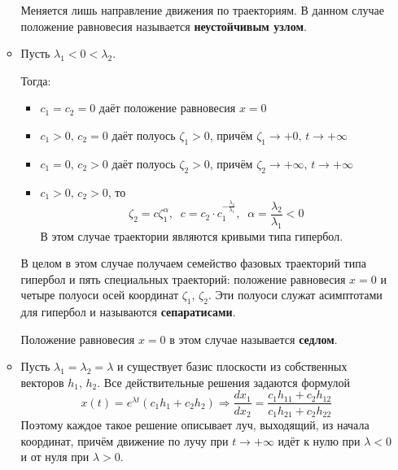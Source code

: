 \documentclass[a4paper,12pt]{article}
\theoremstyle{plain}
\theoremstyle{definition}
\theoremstyle{remark}
\begin{document}
\begin{enumerate}
\begin{itemize}
		            Меняется лишь направление движения по траекториям. В данном случае положение равновесия называется \textbf{неустойчивым узлом}.
		      \item Пусть $\lambda_1 < 0 < \lambda_2$.

		            Тогда:
		            \begin{itemize}
			            \item $c_1 = c_2 = 0$ даёт положение равновесия $x = 0$
			            \item $c_1 > 0,\, c_2 = 0$ даёт полуось $\zeta_1 > 0$, причём $\zeta_1 \to +0,\, t \to +\infty$
			            \item $c_1 = 0,\, c_2 > 0$ даёт полуось $\zeta_2 > 0$, причём $\zeta_2 \to +\infty,\, t \to +\infty$
			            \item $c_1 > 0,\, c_2 > 0$, то
			                  \[\zeta_2 = c\zeta_1^\alpha,\;\; c = c_2 \cdot c_1^{-\frac{\lambda_2}{\lambda_1}},\;\; \alpha = \frac{\lambda_2}{\lambda_1} < 0\]
			                  В этом случае траектории являются кривыми типа гипербол.
		            \end{itemize}
		            В целом в этом случае получаем семейство фазовых траекторий типа гипербол и пять специальных траекторий: положение равновесия $x = 0$ и четыре полуоси осей координат $\zeta_1,\, \zeta_2$. Эти полуоси служат асимптотами для гипербол и называются \textbf{сепаратисами}.

		            Положение равновесия $x = 0$ в этом случае называется \textbf{седлом}.
		      \item Пусть $\lambda_1 = \lambda_2 = \lambda$ и существует базис плоскости из собственных векторов $h_1,\,h_2$. Все действительные решения задаются формулой
		            \[x(t) = e^{\lambda t}(c_1h_1 + c_2h_2) \Rightarrow \frac{dx_1}{dx_2} = \frac{c_1h_{11} + c_2h_{12}}{c_1h_{21} + c_2h_{22}}\]
		            Поэтому каждое такое решение описывает луч, выходящий, из начала координат, причём движение по лучу при $t \to +\infty$ идёт к нулю при $\lambda < 0$ и от нуля при $\lambda > 0$.


\end{itemize}
\end{enumerate}
\end{document}
